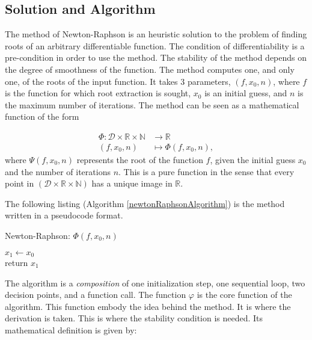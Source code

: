 \documentclass[12pt]{article}
\begin{document}
 	 \subsection {Solution and Algorithm}
  		The method of Newton-Raphson is an heuristic solution to the problem of finding roots of an arbitrary differentiable function. 
  		The condition of differentiability is a pre-condition in order to use the method.  The stability of the method depends on the degree of smoothness of the function.
  		The method computes one, and only one, of the roots of the input function.  
  		It takes 3 parameters, \( (f,x_0,n) \), where \(f\) is the function for which root extraction is sought, 
  		\(x_0\) is an initial guess, and \(n\) is the maximum number of iterations.  The method can be seen as a mathematical function of the form
  
  		\begin{align} \label{eq:functionalPhi}
   			\Phi \colon  \mathcal{D} \times \mathbb{R} \times \mathbb{N}  &\to \mathbb{R} \nonumber\\
   			(f,x_0,n) &\mapsto \Phi(f,x_0,n),
  		\end{align}
	  where \( \Psi (f,x_0,n)\) represents the root of the function \( f\), given the initial guess \(x_0\) and the number of iterations \(n\).  
  	This is a pure function in the sense that every point in \(  (\mathcal{D} \times \mathbb{R} \times \mathbb{N} )\) has a unique image in \( \mathbb{R} \).
  
  	The following listing (Algorithm \ref {newtonRaphsonAlgorithm}) is the method written in a pseudocode format.
  
    	\begin{algorithm}[H]
     	\caption{Newton-Raphson: $\Phi (f,x_0,n)$}
     	\label {newtonRaphsonAlgorithm}
    		$x_1 \gets x_0$ \\
    		return $x_1$
    \end{algorithm}
    
  	The algorithm is a \textit{composition} of one initialization step, one sequential loop, two decision points, and a function call.
  	The function \(\varphi\) is the core function of the algorithm.  This function embody the idea behind the method. 
  	It is where the derivation is taken. This is where the stability condition is needed.  Its mathematical definition is given by:
  
\end{document}
